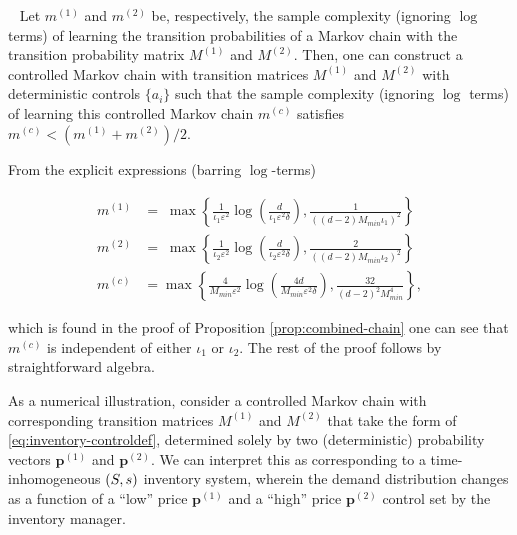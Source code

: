 \documentclass[opre,sglanonrev]{informs4}
\numberwithin{equation}{section}
\newcommand{\pow}[1]{^{(#1)}}
\newcommand{\lp}{\left(}
\newcommand{\rp}{\right)}
\newcommand{\lc}{\left\{}
\newcommand{\rc}{\right\}}
\newcommand{\eps}{\varepsilon}
\renewcommand{\epsilon}{\eps}
\begin{document}
{{{{\begin{proposition}~\label{prop:combined-chain} Let $m\pow 1$ and $m\pow 2$ be, respectively, the sample complexity (ignoring $\log$ terms) of learning the transition probabilities of a Markov chain with the transition probability matrix $M\pow 1$ and $M\pow 2$. 
Then, one can construct a controlled Markov chain with transition matrices $M\pow 1$ and $M\pow 2$ with deterministic controls $\{a_i\}$ such that the sample complexity (ignoring $\log$ terms) of learning this controlled Markov chain  $m\pow c$ satisfies
$
m\pow c < (m\pow 1+m\pow 2)/2$.
    
\end{proposition}
{
\begin{remark}
   From the explicit expressions (barring $\log$-terms)
   \begin{small}
   \begin{align*}
        m\pow 1 & = \; \max\left\{\frac{1}{\iota_1\eps^2}\log\lp \frac{d}{\iota_1\epsilon^2\delta} \rp, \frac{1}{\lp(d-2)M_{min}\iota_1\rp^2}\right\}\\
        m\pow 2 & = \; \max\left\{\frac{1}{\iota_2\eps^2}\log\lp \frac{d}{\iota_2\epsilon^2\delta} \rp, \frac{2}{\lp(d-2)M_{min}\iota_2\rp^2}\right\}\\
         m\pow c & =\max\lc \frac{4}{M_{min}\eps^2}\log\lp\frac{4d}{M_{min}\epsilon^2\delta}\rp, \frac{32}{(d-2)^2 M_{min}^4}\rc,
    \end{align*}
   \end{small}
    which is found in the proof of Proposition \ref{prop:combined-chain} one can see that $m\pow c$ is independent of either $\iota_1$ or $\iota_2$. The rest of the proof follows by straightforward algebra.
\end{remark}
}

{

As a numerical illustration, consider a controlled Markov chain  with corresponding transition matrices $M\pow 1$ and $M\pow 2$ that take the form of \cref{eq:inventory-controldef}, determined solely by two (deterministic) probability vectors $\textbf{p}\pow 1$ and $\textbf{p}\pow 2$. 
We can interpret this as corresponding to a time-inhomogeneous $(\texttt{\textbf{S}},\texttt{\textbf{s}})$ inventory system, wherein the demand distribution changes as a function of a ``low'' price $\textbf{p}\pow 1$ and a ``high'' price $\textbf{p}\pow 2$ control set by the inventory manager. 

}}}}}
\end{document}
